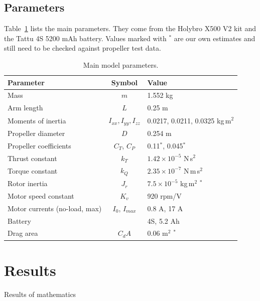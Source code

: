 \documentclass[11pt]{article}
\begin{document}
\subsection{Parameters}

Table~\ref{tab:params} lists the main parameters. They come from the Holybro X500 V2 kit and the Tattu 4S 5200 mAh battery. Values marked with $^*$ are our own estimates and still need to be checked against propeller test data.
\begin{table}[htbp]
\centering
\caption{Main model parameters.}
\label{tab:params}
\small
\begin{tabular}{l c l}
\hline
Parameter & Symbol & Value \\
\hline
Mass & $m$ & 1.552 kg \\
Arm length & $L$ & 0.25 m \\
Moments of inertia & $I_{xx}, I_{yy}, I_{zz}$ & 0.0217, 0.0211, 0.0325 kg\,m$^2$ \\
Propeller diameter & $D$ & 0.254 m \\
Propeller coefficients & $C_T$, $C_P$ & 0.11$^*$, 0.045$^*$ \\
Thrust constant & $k_T$ & $1.42\times10^{-5}$ N\,s$^2$ \\
Torque constant & $k_Q$ & $2.35\times10^{-7}$ N\,m\,s$^2$ \\
Rotor inertia & $J_r$ & $7.5\times10^{-5}$ kg\,m$^2$ $^*$ \\
Motor speed constant & $K_v$ & 920 rpm/V \\
Motor currents (no-load, max) & $I_0$, $I_{max}$ & 0.8 A, 17 A \\
Battery & & 4S, 5.2 Ah \\
Drag area & $C_dA$ & 0.06 m$^2$ $^*$ \\
\hline
\end{tabular}
\end{table}

\newpage
\section{Results}
\par Results of mathematics

\newpage
\end{document}
